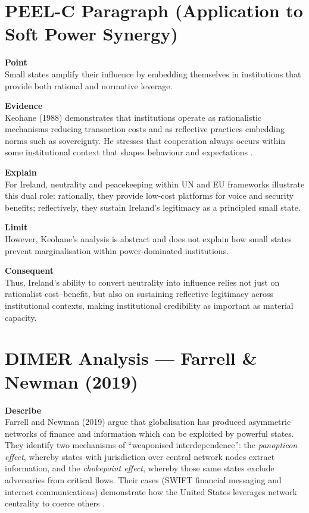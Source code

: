 \section*{PEEL-C Paragraph (Application to Soft Power Synergy)}

\textbf{Point} \\
Small states amplify their influence by embedding themselves in institutions that provide both rational and normative leverage.  

\textbf{Evidence} \\
Keohane (1988) demonstrates that institutions operate as rationalistic mechanisms reducing transaction costs and as reflective practices embedding norms such as sovereignty. He stresses that cooperation always occurs within some institutional context that shapes behaviour and expectations \parencite{KEOHANE_1988}.  

\textbf{Explain} \\
For Ireland, neutrality and peacekeeping within UN and EU frameworks illustrate this dual role: rationally, they provide low-cost platforms for voice and security benefits; reflectively, they sustain Ireland’s legitimacy as a principled small state.  

\textbf{Limit} \\
However, Keohane’s analysis is abstract and does not explain how small states prevent marginalisation within power-dominated institutions.  

\textbf{Consequent} \\
Thus, Ireland’s ability to convert neutrality into influence relies not just on rationalist cost–benefit, but also on sustaining reflective legitimacy across institutional contexts, making institutional credibility as important as material capacity.  

\section*{DIMER Analysis — Farrell \& Newman (2019)}

\textbf{Describe} \\
Farrell and Newman (2019) argue that globalisation has produced asymmetric networks of finance and information which can be exploited by powerful states. They identify two mechanisms of ``weaponised interdependence'': the \textit{panopticon effect}, whereby states with jurisdiction over central network nodes extract information, and the \textit{chokepoint effect}, whereby those same states exclude adversaries from critical flows. Their cases (SWIFT financial messaging and internet communications) demonstrate how the United States leverages network centrality to coerce others \parencite{FARRELL_2019}.


